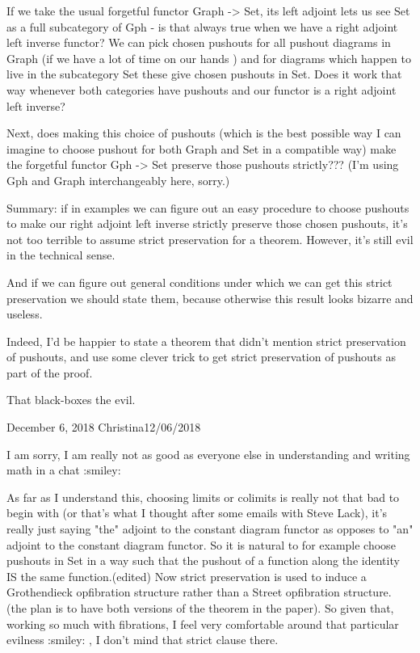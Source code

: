 \documentclass{amsart}
\begin{document}
If we take the usual forgetful functor Graph -> Set, its left adjoint lets us see Set as a full subcategory of Gph - is that always true when we have a right adjoint left inverse functor?
We can pick chosen pushouts for all pushout diagrams in Graph (if we have a lot of time on our hands ) and for diagrams which happen to live in the subcategory Set these give chosen pushouts in Set.
Does it work that way whenever both categories have pushouts and our functor is a right adjoint left inverse?

Next, does making this choice of pushouts (which is the best possible way I can imagine to choose pushout for both Graph and Set in a compatible way) make the forgetful functor Gph -> Set preserve those pushouts strictly???
(I'm using Gph and Graph interchangeably here, sorry.)

Summary: if in examples we can figure out an easy procedure to choose pushouts to make our right adjoint left inverse strictly preserve those chosen pushouts, it's not too terrible to assume strict preservation for a theorem.
However, it's still evil in the technical sense.

And if we can figure out general conditions under which we can get this strict preservation we should state them, because otherwise this result looks bizarre and useless.

Indeed, I'd be happier to state a theorem that didn't mention strict preservation of pushouts, and use some clever trick to get strict preservation of pushouts as part of the proof.

That black-boxes the evil.

December 6, 2018
Christina12/06/2018

I am sorry, I am really not as good as everyone else in understanding and writing math in a chat :smiley: 

As far as I understand this, choosing limits or colimits is really not that bad to begin with (or that's what I thought after some emails with Steve Lack), it's really just saying "the" adjoint to the constant diagram functor as opposes to "an" adjoint to the constant diagram functor. So it is natural to for example choose pushouts in Set in a way such that the pushout of a function along the identity IS the same function.(edited)
Now strict preservation is used to induce a Grothendieck opfibration structure rather than a Street opfibration structure. (the plan is to have both versions of the theorem in the paper). So given that, working so much with fibrations, I feel very comfortable around that particular evilness :smiley: , I don't mind that strict clause there.
\end{document}
